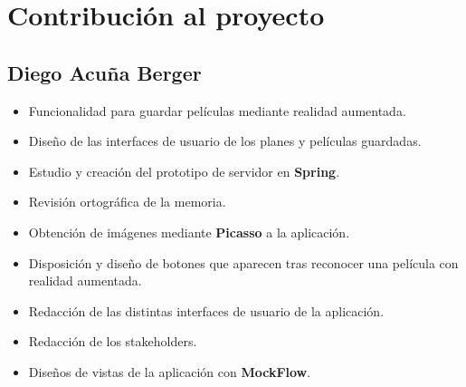 
\cleardoublepage


\chapter{Contribución al proyecto}
\label{makereference7}

\section{Diego Acuña Berger}
\label{makereference7.1}
\begin{itemize}
    \item Funcionalidad para guardar películas mediante realidad aumentada.
    \item Diseño de las interfaces de usuario de los planes y películas guardadas.  
    \item Estudio y creación del prototipo de servidor en \textbf{Spring}.
    \item Revisión ortográfica de la memoria.
    \item Obtención de imágenes mediante \textbf{Picasso} a la aplicación.
    \item Disposición y diseño de botones que aparecen tras reconocer una película con realidad aumentada.
    \item Redacción de las distintas interfaces de usuario de la aplicación.
    \item Redacción de los stakeholders.
    \item Diseños de vistas de la aplicación con \textbf{MockFlow}.
\end{itemize}
